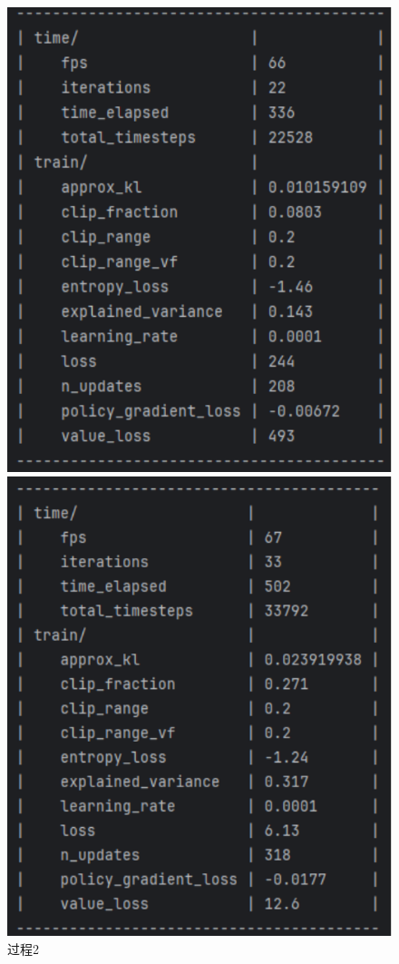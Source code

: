 \begin{figure}[H]
\begin{minipage}{0.24\textwidth}
        \includegraphics[width=\textwidth]{images/training2.pdf}
        \caption{过程2}
    \end{minipage}%
    \begin{minipage}{0.24\textwidth}
        \centering
        \includegraphics[width=\textwidth]{images/training3.pdf}

\end{minipage}
\end{figure}
